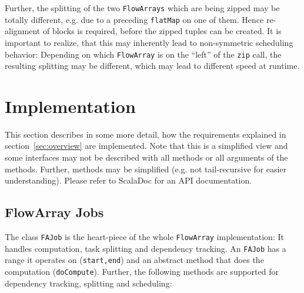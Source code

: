 \documentclass[runningheads,a4paper,fleqn]{llncs}
\begin{document}
Further, the splitting of the two \texttt{FlowArrays} which are being zipped
may be totally different, e.g. due to a preceding \texttt{flatMap} on
one of them. Hence re-alignment of blocks is required,
before the zipped tuples can be created. It is important to realize,
that this may inherently lead to non-symmetric scheduling behavior:
Depending on which \texttt{FlowArray} is on the ``left'' of the \texttt{zip}
call, the resulting splitting may be different, which may lead to
different speed at runtime. 

\section{Implementation}
\label{sec:implementation}

This section describes in some more detail, how the requirements
explained in section~\ref{sec:overview} are implemented. Note that
this is a simplified view and some interfaces may not be described
with all methods or all arguments of the methods. Further, methods may
be simplified (e.g. not tail-recursive for easier
understanding). Please refer to ScalaDoc for an API documentation.

\subsection{FlowArray Jobs}
The class \texttt{FAJob} is the heart-piece of the whole \texttt{FlowArray}
implementation: It handles computation, task splitting and dependency
tracking. An \texttt{FAJob} has a range it operates on
(\texttt{start,end}) and an abstract method that does the computation
(\texttt{doCompute}). Further, the following methods are supported for
dependency tracking, splitting and scheduling:
\end{document}
